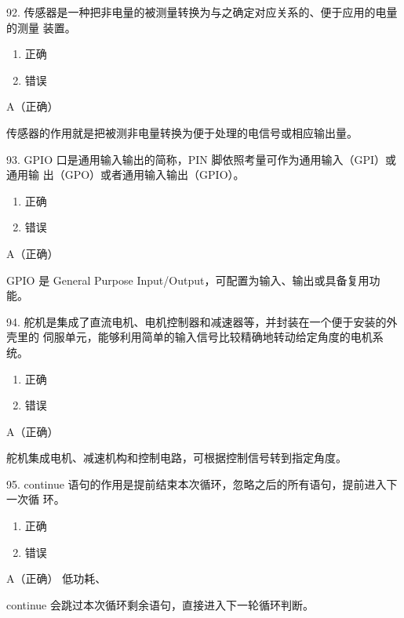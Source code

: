 \begin{question}{92. 传感器是一种把非电量的被测量转换为与之确定对应关系的、便于应用的电量的测量 装置。}
\begin{enumerate}[label=\Alph*., leftmargin=2.4em, itemsep=0.2em]
\item 正确
\item 错误
\end{enumerate}
\end{question}
\begin{answer}
A（正确）
\end{answer}
\begin{explanation}
传感器的作用就是把被测非电量转换为便于处理的电信号或相应输出量。
\end{explanation}

\begin{question}{93. GPIO 口是通用输入输出的简称，PIN 脚依照考量可作为通用输入（GPI）或通用输 出（GPO）或者通用输入输出（GPIO）。}
\begin{enumerate}[label=\Alph*., leftmargin=2.4em, itemsep=0.2em]
\item 正确
\item 错误
\end{enumerate}
\end{question}
\begin{answer}
A（正确）
\end{answer}
\begin{explanation}
GPIO 是 General Purpose Input/Output，可配置为输入、输出或具备复用功能。
\end{explanation}

\begin{question}{94. 舵机是集成了直流电机、电机控制器和减速器等，并封装在一个便于安装的外壳里的 伺服单元，能够利用简单的输入信号比较精确地转动给定角度的电机系统。}
\begin{enumerate}[label=\Alph*., leftmargin=2.4em, itemsep=0.2em]
\item 正确
\item 错误
\end{enumerate}
\end{question}
\begin{answer}
A（正确）
\end{answer}
\begin{explanation}
舵机集成电机、减速机构和控制电路，可根据控制信号转到指定角度。
\end{explanation}

\begin{question}{95. continue 语句的作用是提前结束本次循环，忽略之后的所有语句，提前进入下一次循 环。}
\begin{enumerate}[label=\Alph*., leftmargin=2.4em, itemsep=0.2em]
\item 正确
\item 错误
\end{enumerate}
\end{question}
\begin{answer}
A（正确） 低功耗、
\end{answer}
\begin{explanation}
continue 会跳过本次循环剩余语句，直接进入下一轮循环判断。
\end{explanation}


